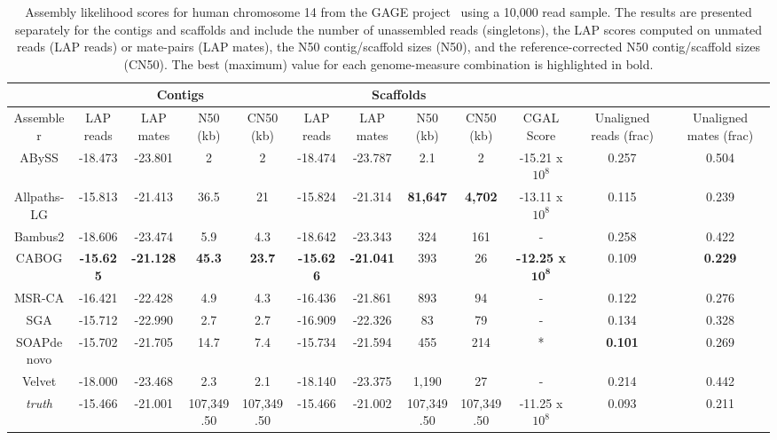 \begin{landscape}
\renewcommand{\baselinestretch}{1}
\small\normalsize
\begin{table}[tb!]
\centering
\tiny
\begin{tabular}{|c|c|c|c|c|c|c|c|c|c|c|c|}
\hline
 & \multicolumn{4}{c|}{Contigs} & \multicolumn{4}{c|}{Scaffolds} & & & \\
\hline
Assembler & LAP reads & LAP mates & N50 (kb) & CN50 (kb) & LAP reads & LAP mates & N50 (kb) & CN50 (kb) & CGAL Score & Unaligned reads (frac) & Unaligned mates (frac)\\
\hline
ABySS & -18.473 & -23.801 & 2 & 2 & -18.474 & -23.787 & 2.1 & 2 & -15.21 x $10^8$ &0.257 & 0.504\\
Allpaths-LG & -15.813 & -21.413 & 36.5 & 21 & -15.824 & -21.314 & {\bf 81,647} & {\bf 4,702} & -13.11 x $10^8$ &0.115 & 0.239\\
Bambus2 & -18.606 & -23.474 & 5.9 & 4.3 & -18.642 & -23.343 & 324 & 161 & - & 0.258 & 0.422\\
CABOG & {\bf -15.625} & {\bf -21.128} & {\bf 45.3} & {\bf 23.7} & {\bf -15.626} & {\bf -21.041} & 393 & 26 & {\bf -12.25 x} $\mathbf{10^8}$ & 0.109 & {\bf 0.229}\\
MSR-CA & -16.421 & -22.428 & 4.9 & 4.3 & -16.436 & -21.861 & 893 & 94 & - & 0.122 & 0.276\\
SGA & -15.712 & -22.990 & 2.7 & 2.7 & -16.909 & -22.326 & 83 & 79 & - & 0.134 & 0.328\\
SOAPdenovo & -15.702 & -21.705 & 14.7 & 7.4 & -15.734 & -21.594 & 455 & 214 & * & {\bf 0.101} & 0.269 \\
Velvet & -18.000 & -23.468 & 2.3 & 2.1 & -18.140 & -23.375 & 1,190 & 27 & - & 0.214 & 0.442\\
\emph{truth} & -15.466 & -21.001 & 107,349.50 & 107,349.50 & -15.466 & -21.002 & 107,349.50 & 107,349.50 & -11.25 x $10^8$ & 0.093 & 0.211 \\
\hline
\end{tabular}
\caption[\emph{Homo sapiens} chr 14 assembly evaluation.]{Assembly likelihood scores for human chromosome 14 from the GAGE project~\cite{earl2011assemblathon} using a 10,000 read sample.
The results are presented
separately for the contigs and scaffolds and include the number of
unassembled reads (singletons), the LAP scores computed on unmated reads (LAP reads) or
mate-pairs (LAP mates), the N50 contig/scaffold sizes (N50),
and the reference-corrected N50 contig/scaffold sizes (CN50).
The best (maximum) value for each
genome-measure combination is highlighted in bold.
}
\end{table}
\end{landscape}
